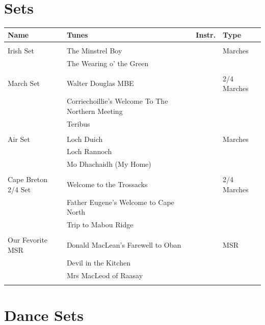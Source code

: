 

\cleardoublepage
\chapter{Sets}
\vspace*{\fill}\newpage

\begin{tabular}{ l l l l}
  \textbf{Name} & \textbf{Tunes} & \textbf{Instr.} & \textbf{Type}\\
  \hline
    & & & \\
Irish Set & The Minstrel Boy & & Marches\\
        & The Wearing o’ the Green & &\\
        \\
March Set & Walter Douglas MBE & & 2/4 Marches\\
        & Corriechoillie’s Welcome To The Northern Meeting & &\\
        & Teribus & &\\
        \\
Air Set & Loch Duich & & Marches\\
        & Loch Rannoch & &\\
        & Mo Dhachaidh (My Home) & &\\
        \\
Cape Breton 2/4 Set & Welcome to the Trossacks & & 2/4 Marches\\
        & Father Eugene's Welcome to Cape North & &\\
        & Trip to Mabou Ridge & &\\
        \\
Our Fevorite MSR & Donald MacLean's Farewell to Oban & & MSR\\
                   & Devil in the Kitchen & &\\
                   & Mrs MacLeod of Raasay & &\\
                   \\
\end{tabular}

\cleardoublepage
\chapter{Dance Sets}
\vspace*{\fill}\newpage

